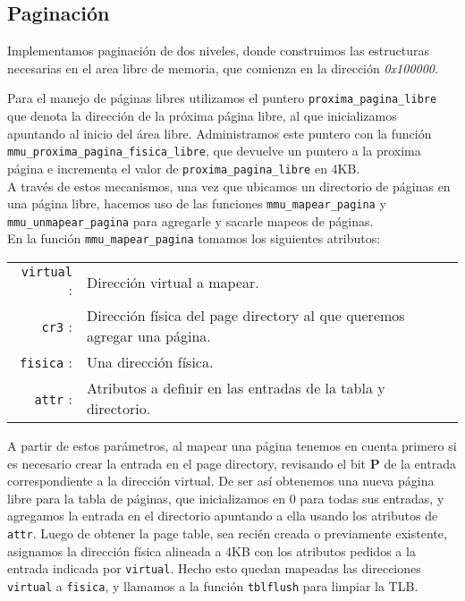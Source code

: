 \vspace{10pt}
\subsection{Paginación}
\label{sec-paginacion} 

Implementamos paginación de dos niveles, donde construimos las estructuras necesarias en  el area libre de memoria, que comienza en la dirección \textit{0x100000}.

Para el manejo de páginas libres utilizamos el puntero \verb|proxima_pagina_libre| que denota la dirección de la próxima página libre, al que inicializamos apuntando al inicio del área libre.
Administramos este puntero con la función \verb|mmu_proxima_pagina_fisica_libre|, que devuelve un puntero a la proxima página e incrementa el valor de \verb|proxima_pagina_libre| en 4KB.\\

A través de estos mecanismos, una vez que ubicamos un directorio de páginas en una página libre, hacemos uso de las funciones \verb|mmu_mapear_pagina| y \verb|mmu_unmapear_pagina| para agregarle y sacarle mapeos de páginas.\\

\vspace{10pt}
En la función \verb|mmu_mapear_pagina| tomamos los siguientes atributos:


\begin{center}
	\begin{tabular}{r p{} }
		\verb|virtual| : & Dirección virtual a mapear. \\
		\verb|cr3| : & Dirección física del page directory al que queremos agregar una página.\\
		\verb|fisica| : & Una dirección física. \\
		\verb|attr| : & Atributos a definir en las entradas de la tabla y directorio.\\
	\end{tabular}
\end{center}

\newpage

A partir de estos parámetros, al mapear una página tenemos en cuenta primero si es necesario crear la entrada en el page directory, revisando el bit \textbf{P} de la entrada correspondiente a la dirección virtual.
De ser así obtenemos una nueva página libre para la tabla de páginas, que inicializamos en 0 para todas sus entradas, y agregamos la entrada en el directorio apuntando a ella usando los atributos de \verb|attr|.
Luego de obtener la page table, sea recién creada o previamente existente, asignamos la dirección física alineada a 4KB con los atributos pedidos a la entrada indicada por \verb|virtual|.
Hecho esto quedan mapeadas las direcciones \verb|virtual| a \verb|fisica|, y llamamos a la función \verb|tblflush| para limpiar la TLB.\\


